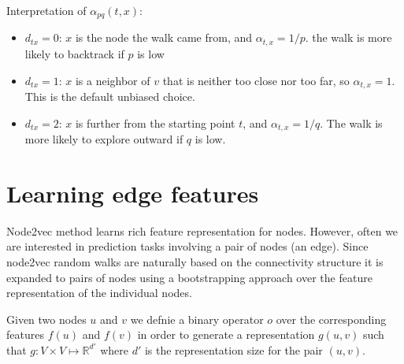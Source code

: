 \documentclass{article}
\begin{document}
Interpretation of $\alpha_{pq}(t,x)$:
\begin{itemize}
  \item $d_{tx}=0$: $x$ is the node the walk came from, and $\alpha_{t,x} =
    1/p$. the walk is more likely to  backtrack if $p$ is low
  \item $d_{tx}=1$: $x$ is a neighbor of $v$ that is neither too close nor too far,
    so $\alpha_{t,x} = 1$. This is the default unbiased choice.
  \item $d_{tx}=2$: $x$ is further from the starting point $t$, and $\alpha_{t,x} = 1/q$.
    The walk is more likely to explore outward if $q$ is low.

\end{itemize}

\section{Learning edge features}
Node2vec method learns rich feature representation for nodes. However, often we
are interested in prediction tasks involving a pair of nodes (an edge). Since
node2vec random walks are naturally based on the connectivity structure it is
expanded to pairs of nodes using a bootstrapping approach over the feature
representation of the individual nodes.

Given two nodes $u$ and $v$ we defnie a binary operator $o$ over the
corresponding features $f(u)$ and $f(v)$ in order to generate a representation
$g(u,v)$ such that $g : V \times V \mapsto \mathbb{R}^{d'}$ where $d'$ is the
representation size for the pair $(u,v)$.
\end{document}
